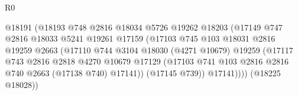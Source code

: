 \begin{lexlean}{R0}
\begin{coremodule}
                                          @18191
                                          (@18193
                                            @748
                                            @2816
                                            @18034
                                            @5726
                                            @19262
                                            @18203
                                            (@17149
                                              @747
                                              @2816
                                              @18033
                                              @5241
                                              @19261
                                              @17159
                                              (@17103
                                                @745
                                                @103
                                                @18031
                                                @2816
                                                @19259
                                                @2663
                                                (@17110
                                                  @744
                                                  @3104
                                                  @18030
                                                  (@4271 @10679)
                                                  @19259
                                                  (@17117
                                                    @743
                                                    @2816
                                                    @2818
                                                    @4270
                                                    @10679
                                                    @17129
                                                    (@17103
                                                      @741
                                                      @103
                                                      @2816
                                                      @2816
                                                      @740
                                                      @2663
                                                      (@17138 @740)
                                                      @17141))
                                                  (@17145 @739))
                                                @17141))))
                                        (@18225 @18028))

\end{coremodule}
\end{lexlean}
